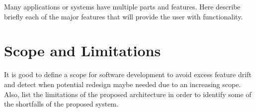 \documentclass{article}
\begin{document}
Many applications or systems have multiple parts and features. Here describe
briefly each of the major features that will provide the user with
functionality.

\section{Scope and Limitations}

It is good to define a scope for software development to avoid excess feature
drift and detect when potential redesign maybe needed due to an increasing
scope. Also, list the limitations of the proposed architecture in order to
identify some of the shortfalls of the proposed system.
\end{document}
